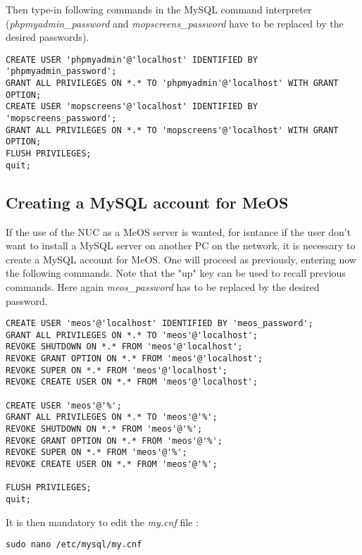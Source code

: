 \documentclass[a4paper]{ffco-rapport}
\begin{document}
		Then type-in following commands in the MySQL command interpreter (\emph{phpmyadmin\_password} and \emph{mopscreens\_password} have to be replaced by the desired passwords).

\makeatletter
\global\let\tikz@ensure@dollar@catcode=\relax
\makeatother
	
			\begin{verbatim}
CREATE USER 'phpmyadmin'@'localhost' IDENTIFIED BY 'phpmyadmin_password';
GRANT ALL PRIVILEGES ON *.* TO 'phpmyadmin'@'localhost' WITH GRANT OPTION;
CREATE USER 'mopscreens'@'localhost' IDENTIFIED BY 'mopscreens_password';
GRANT ALL PRIVILEGES ON *.* TO 'mopscreens'@'localhost' WITH GRANT OPTION;
FLUSH PRIVILEGES;
quit;
			\end{verbatim}

	\subsection{Creating a MySQL account for MeOS}
	
		If the use of the NUC as a MeOS server is wanted, for isntance if the user don't want to install a MySQL server on another PC on the network, it is necessary to create a MySQL account for MeOS.
		One will proceed as previously, entering now the following commands. Note that the "up" key can be used to recall previous commands. Here again \emph{meos\_password} has to be replaced by the desired password.
	
			\begin{verbatim}
CREATE USER 'meos'@'localhost' IDENTIFIED BY 'meos_password';
GRANT ALL PRIVILEGES ON *.* TO 'meos'@'localhost';
REVOKE SHUTDOWN ON *.* FROM 'meos'@'localhost';
REVOKE GRANT OPTION ON *.* FROM 'meos'@'localhost';
REVOKE SUPER ON *.* FROM 'meos'@'localhost';
REVOKE CREATE USER ON *.* FROM 'meos'@'localhost';

CREATE USER 'meos'@'%';
GRANT ALL PRIVILEGES ON *.* TO 'meos'@'%';
REVOKE SHUTDOWN ON *.* FROM 'meos'@'%';
REVOKE GRANT OPTION ON *.* FROM 'meos'@'%';
REVOKE SUPER ON *.* FROM 'meos'@'%';
REVOKE CREATE USER ON *.* FROM 'meos'@'%';

FLUSH PRIVILEGES;
quit;
			\end{verbatim}
	
		It is then mandatory to edit the \emph{my.cnf} file :
	
		\verb|sudo nano /etc/mysql/my.cnf|
		
\end{document}
